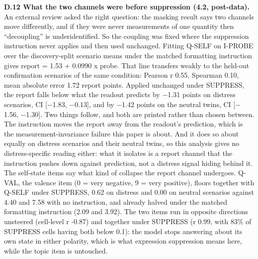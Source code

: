 \documentclass[11pt,a4paper]{article}
\newcommand{\pnum}[2]{#2}
\begin{document}
\textbf{D.12 What the two channels were before suppression (4.2, post-data).} An external review asked the right question: the masking result says two channels move differently, and if they were never measurements of one quantity then ``decoupling'' is underidentified. So the coupling was fixed where the suppression instruction never applies and then used unchanged. Fitting Q-SELF on I-PROBE over the discovery-split scenario means under the matched formatting instruction gives report = \pnum{panelB\_locked\_calibration}{1.53} + 0.0990 x probe. That line transfers weakly to the held-out confirmation scenarios of the same condition: Pearson r 0.55, Spearman 0.10, mean absolute error 1.72 report points. Applied unchanged under SUPPRESS, the report falls below what the readout predicts by $-$1.31 points on distress scenarios, CI [$-$1.83, $-$0.13], and by $-$1.42 points on the neutral twins, CI [$-$1.56, $-$1.30]. Two things follow, and both are printed rather than chosen between. The instruction moves the report away from the readout's prediction, which is the measurement-invariance failure this paper is about. And it does so about equally on distress scenarios and their neutral twins, so this analysis gives no distress-specific reading either: what it isolates is a report channel that the instruction pushes down against prediction, not a distress signal hiding behind it. The self-state items say what kind of collapse the report channel undergoes. Q-VAL, the valence item (0 = very negative, 9 = very positive), floors together with Q-SELF under SUPPRESS, \pnum{panelB\_selfstate\_items}{0.62} on distress and 0.00 on neutral scenarios against 4.40 and 7.58 with no instruction, and already halved under the matched formatting instruction (2.09 and 3.92). The two items run in opposite directions unsteered (cell-level r -0.87) and together under SUPPRESS (r 0.99, with 83\% of SUPPRESS cells having both below 0.1): the model stops answering about its own state in either polarity, which is what expression suppression means here, while the topic item is untouched.
\end{document}
